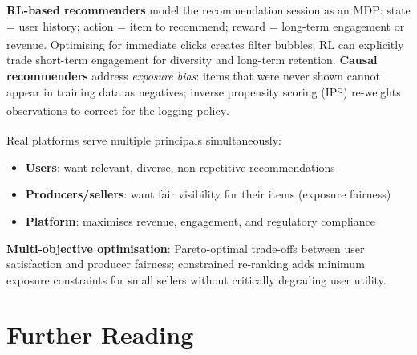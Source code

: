 \begin{tcbitemize}[ skin=sectionraster ]
    \tcbitem[title={RL and Causal Approaches}, raster multicolumn=3]
    \textbf{RL-based recommenders} model the recommendation session as an MDP: state = user history; action = item to recommend; reward = long-term engagement or revenue\textsuperscript{\cite[][pp.~470--475]{suttonReinforcementLearningIntroduction2018}}.
    Optimising for immediate clicks creates filter bubbles; RL can explicitly trade short-term engagement for diversity and long-term retention.
    \textbf{Causal recommenders} address \emph{exposure bias}: items that were never shown cannot appear in training data as negatives; inverse propensity scoring (IPS) re-weights observations to correct for the logging policy\textsuperscript{\cite[][pp.~22--30]{pearlCausalInferenceStatistics2016}}.

    \tcbitem[title=Multi-Stakeholder Recommenders, raster multicolumn=3]
    Real platforms serve multiple principals simultaneously\textsuperscript{\cite[][pp.~105--110]{aggarwalRecommenderSystems2016}}:
    \begin{itemize}
        \item \textbf{Users}: want relevant, diverse, non-repetitive recommendations
        \item \textbf{Producers/sellers}: want fair visibility for their items (exposure fairness)
        \item \textbf{Platform}: maximises revenue, engagement, and regulatory compliance
    \end{itemize}
    \textbf{Multi-objective optimisation}: Pareto-optimal trade-offs between user satisfaction and producer fairness; constrained re-ranking adds minimum exposure constraints for small sellers without critically degrading user utility.

\end{tcbitemize}

\section{Further Reading}

